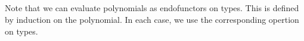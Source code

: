 \begin{code}%
\>[0]\AgdaSpace{}%
\AgdaSpace{}%
\AgdaSymbol{:}\AgdaSpace{}%
\AgdaSpace{}%
\AgdaSpace{}%
\AgdaSpace{}%
\<%
\\
\>[0][@{}l@{\AgdaIndent{0}}]%
\>[4]\AgdaSpace{}%
\AgdaSymbol{:}\AgdaSpace{}%
\AgdaSpace{}%
\AgdaSymbol{\{}\AgdaSymbol{\}}\AgdaSpace{}%
\AgdaSpace{}%
\AgdaSpace{}%
\AgdaSpace{}%
\AgdaSpace{}%
\AgdaSpace{}%
\<%
\\
%
\>[4]\AgdaSpace{}%
\AgdaSymbol{:}\AgdaSpace{}%
\AgdaSpace{}%
\AgdaSymbol{\{}\AgdaSymbol{\}}\AgdaSpace{}%
\AgdaSpace{}%
\AgdaSpace{}%
\<%
\\
%
\>[4]\AgdaSpace{}%
\AgdaSpace{}%
\AgdaSymbol{:}\AgdaSpace{}%
\AgdaSpace{}%
\AgdaSymbol{\{}\AgdaSymbol{\}}\AgdaSpace{}%
\AgdaSpace{}%
\AgdaSpace{}%
\AgdaSpace{}%
\AgdaSpace{}%
\AgdaSpace{}%
\AgdaSpace{}%
\AgdaSpace{}%
\AgdaSpace{}%
\<%
\\
%
\>[4]\AgdaSpace{}%
\AgdaSymbol{:}\AgdaSpace{}%
\AgdaSpace{}%
\AgdaSpace{}%
\AgdaSpace{}%
\AgdaSpace{}%
\<%
\end{code}

Note that we can evaluate polynomials as endofunctors on types.
This is defined by induction on the polynomial.
In each case, we use the corresponding opertion on types.

\begin{code}%
\>[0]\AgdaSpace{}%
\AgdaSymbol{:}\AgdaSpace{}%
\AgdaSpace{}%
\AgdaSymbol{\{}\AgdaSymbol{\}}\AgdaSpace{}%
\AgdaSpace{}%
\AgdaSpace{}%
\AgdaSpace{}%
\AgdaSpace{}%
\AgdaSpace{}%
\AgdaSpace{}%
\AgdaSpace{}%
\AgdaSpace{}%
\<%
\end{code}

